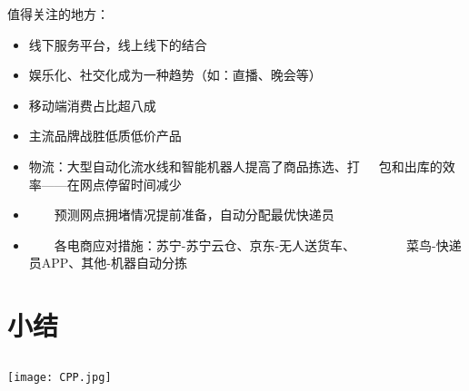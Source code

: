 \documentclass{beamer}
\begin{document}
\begin{frame}
值得关注的地方：
\begin{itemize}
\item 线下服务平台，线上线下的结合
\item 娱乐化、社交化成为一种趋势（如：直播、晚会等）
\item 移动端消费占比超八成
\item 主流品牌战胜低质低价产品
\item 物流：大型自动化流水线和智能机器人提高了商品拣选、打\ \ \ 包和出库的效率——在网点停留时间减少
\item \ \ \ \ 预测网点拥堵情况提前准备，自动分配最优快递员
\item \ \ \ \ 各电商应对措施：苏宁-苏宁云仓、京东-无人送货车、\ \ \ \ \ \ \ \ 菜鸟-快递员APP、其他-机器自动分拣
\end{itemize}


\end{frame}

\section{小结\ \ \ \ \ \ \ \ \ \ \ \ \ \ \ \ \ \ \ \ \ \ \ \ \ \ \ }
\subsection{}


\begin{frame}
\begin{center}
  \texttt{[image: CPP.jpg]}
\end{center}
\end{frame}
\end{document}
